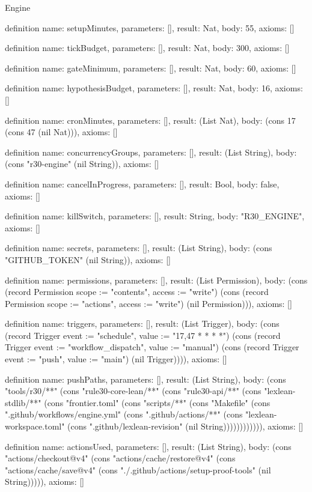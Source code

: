\begin{lexlean}{Engine}
\begin{semanticmodule}
definition{
  name: setupMinutes,
  parameters: [],
  result: Nat,
  body: 55,
  axioms: []
}

definition{
  name: tickBudget,
  parameters: [],
  result: Nat,
  body: 300,
  axioms: []
}

definition{
  name: gateMinimum,
  parameters: [],
  result: Nat,
  body: 60,
  axioms: []
}

definition{
  name: hypothesisBudget,
  parameters: [],
  result: Nat,
  body: 16,
  axioms: []
}

definition{
  name: cronMinutes,
  parameters: [],
  result: (List Nat),
  body: (cons 17 (cons 47 (nil Nat))),
  axioms: []
}

definition{
  name: concurrencyGroups,
  parameters: [],
  result: (List String),
  body: (cons "r30-engine" (nil String)),
  axioms: []
}

definition{
  name: cancelInProgress,
  parameters: [],
  result: Bool,
  body: false,
  axioms: []
}

definition{
  name: killSwitch,
  parameters: [],
  result: String,
  body: "R30_ENGINE",
  axioms: []
}

definition{
  name: secrets,
  parameters: [],
  result: (List String),
  body: (cons "GITHUB_TOKEN" (nil String)),
  axioms: []
}

definition{
  name: permissions,
  parameters: [],
  result: (List Permission),
  body: (cons (record Permission {scope := "contents", access := "write"}) (cons (record Permission {scope := "actions", access := "write"}) (nil Permission))),
  axioms: []
}

definition{
  name: triggers,
  parameters: [],
  result: (List Trigger),
  body: (cons (record Trigger {event := "schedule", value := "17,47 * * * *"}) (cons (record Trigger {event := "workflow_dispatch", value := "manual"}) (cons (record Trigger {event := "push", value := "main"}) (nil Trigger)))),
  axioms: []
}

definition{
  name: pushPaths,
  parameters: [],
  result: (List String),
  body: (cons "tools/r30/**" (cons "rule30-core-lean/**" (cons "rule30-api/**" (cons "lexlean-stdlib/**" (cons "frontier.toml" (cons "scripts/**" (cons "Makefile" (cons ".github/workflows/engine.yml" (cons ".github/actions/**" (cons "lexlean-workspace.toml" (cons ".github/lexlean-revision" (nil String)))))))))))),
  axioms: []
}

definition{
  name: actionsUsed,
  parameters: [],
  result: (List String),
  body: (cons "actions/checkout@v4" (cons "actions/cache/restore@v4" (cons "actions/cache/save@v4" (cons "./.github/actions/setup-proof-tools" (nil String))))),
  axioms: []
}


\end{semanticmodule}
\end{lexlean}
